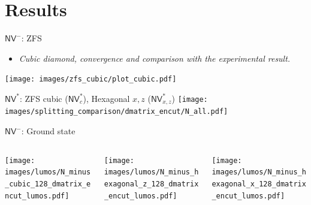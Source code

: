 \documentclass[]{beamer}
\begin{document}

\section{Results} %

\begin{frame}{$ \mathsf{NV}^{-} $: ZFS }
  \begin{itemize}
    \item 
      \textit{Cubic diamond, convergence and comparison with the experimental result.}
  \end{itemize}
  \texttt{[image: images/zfs\_cubic/plot\_cubic.pdf]}
\end{frame}

\begin{frame}{$ \mathsf{NV}^{*} $: ZFS cubic ($ \mathsf{NV}^{*}_{c} $), Hexagonal $ x,z $ ($ \mathsf{NV}_{x,z}^{*} $)   }
  \texttt{[image: images/splitting\_comparison/dmatrix\_encut/N\_all.pdf]}
\end{frame}

\begin{frame}{ $ \mathsf{NV}^{-} $: Ground state}
  \begin{center}
    \begin{columns}
      \begin{column}{0.3\textwidth}
        \texttt{[image: images/lumos/N\_minus\_cubic\_128\_dmatrix\_encut\_lumos.pdf]}
      \end{column}
      \begin{column}{0.3\textwidth}
        \texttt{[image: images/lumos/N\_minus\_hexagonal\_z\_128\_dmatrix\_encut\_lumos.pdf]}
      \end{column}
      \begin{column}{0.3\textwidth}
        \texttt{[image: images/lumos/N\_minus\_hexagonal\_x\_128\_dmatrix\_encut\_lumos.pdf]}
      \end{column}
    \end{columns}
  \end{center}
\end{frame}
\end{document}
